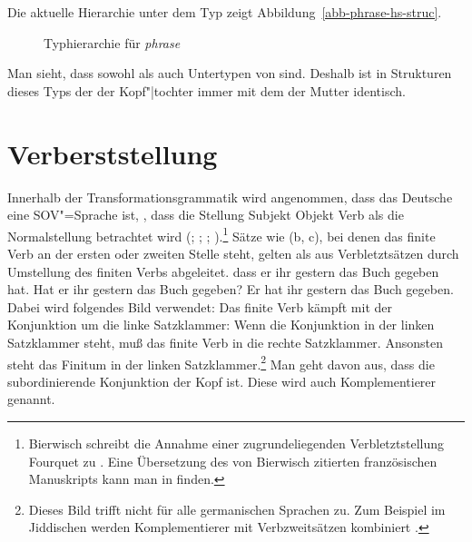 Die aktuelle Hierarchie unter dem Typ  zeigt Abbildung~\vref{abb-phrase-hs-struc}.
\begin{figure}
\caption{\label{abb-phrase-hs-struc}Typhierarchie für \textit{phrase}}
\end{figure}
Man sieht, dass sowohl  als auch 
Untertypen von  sind. Deshalb ist in Strukturen 
dieses Typs der \sprw der Kopf"|tochter immer mit dem \sprw der Mutter identisch.

\section{Verberststellung}
\label{sec-v1}

Innerhalb der Transformationsgrammatik
wird angenommen, dass das Deutsche eine SOV"=Sprache ist, \dash, dass die Stellung
Subjekt Objekt Verb als die Normalstellung betrachtet wird (\citealp{Bach62a}; \citealp*[]{Bierwisch63a};
\citealp{Reis74a}; \citealp[Kapitel~1]{Thiersch78a}).\footnote{%
  Bierwisch schreibt die Annahme einer zugrundeliegenden Verbletztstellung Fourquet
  zu \citep{Fourquet57a}. Eine Übersetzung des von Bierwisch zitierten
  französischen Manuskripts kann man in 
  finden.%
}
Sätze wie (b, c), bei denen das finite Verb an der ersten oder zweiten Stelle steht,
gelten als aus Verbletztsätzen durch Umstellung des finiten Verbs abgeleitet.
\eal
\ex dass er ihr gestern das Buch gegeben hat.
\ex Hat er ihr gestern das Buch gegeben?
\ex Er hat ihr gestern das Buch gegeben.
\zl
Dabei wird folgendes Bild verwendet: Das finite Verb kämpft mit der Konjunktion um die linke Satzklammer:
Wenn die Konjunktion in der linken Satzklammer steht, muß das finite Verb in die rechte Satzklammer.
Ansonsten steht das Finitum in der linken Satzklammer.\footnote{
  Dieses Bild trifft nicht für alle germanischen Sprachen zu. Zum Beispiel im Jiddischen werden
  Komplementierer mit Verbzweitsätzen kombiniert \citep[]{Diesing2004a}.
} Man geht davon aus, dass die subordinierende Konjunktion
der Kopf ist. Diese wird auch Komplementierer genannt.

